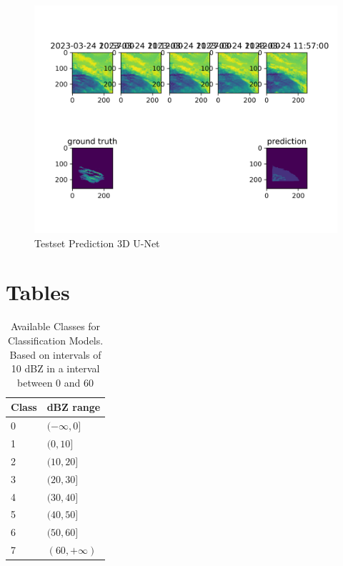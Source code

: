 \documentclass[acmtog, screen, balance]{acmart}
\begin{document}
\begin{figure}[hbp]
  \centering
  \includegraphics[width=400pt]{./images/experiment-160.png}
  \caption{Testset Prediction 3D U-Net}
  \Description{}
  \label{fig:experiment-160}
\end{figure}

\newpage
\section{Tables}

\begin{table}[]
  \caption{Available Classes for Classification Models. Based on intervals of 10 dBZ in a interval between 0 and 60}
  \begin{tabular}{@{}ll@{}}
  \toprule
  Class & dBZ range   \\ \midrule
  0     & $(-\infty, 0]$ \\
  1     & $(0, 10]$  \\
  2     & $(10, 20]$  \\
  3     & $(20, 30]$  \\
  4     & $(30, 40]$  \\
  5     & $(40, 50]$  \\
  6     & $(50, 60]$  \\
  7     & $(60, +\infty)$  \\ \bottomrule
  \end{tabular}
\end{table}
\end{document}
